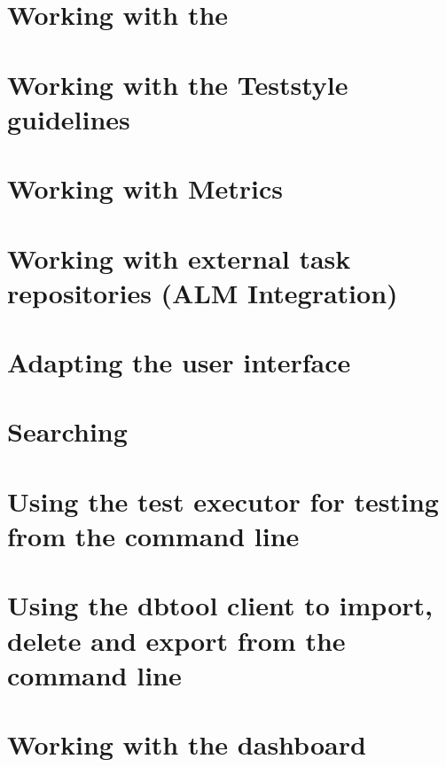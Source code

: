 \clearpage 

\section{Working with the \gdprobview}

\clearpage
\section{Working with the Teststyle guidelines}

\clearpage
\section{Working with Metrics}

\clearpage
\section{Working with external task repositories (ALM Integration)}
\label{TasksALM}



\clearpage

\section{Adapting the user interface}

\clearpage

\section{Searching}

\clearpage


\clearpage

\section{Using the test executor for testing from the command line}


\section{Using the dbtool client to import, delete and export from the command line}
\label{DBTool}


\clearpage
\section{Working with the dashboard}
\label{TasksDashboard}

\clearpage

